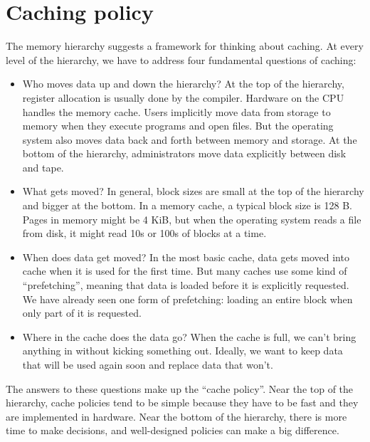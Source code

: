 \documentclass[12pt]{book}
\begin{document}
{\section{Caching policy}

The memory hierarchy suggests a framework for thinking about
caching.  At every level of the hierarchy, we have to address
four fundamental questions of caching:

\begin{itemize}

\item Who moves data up and down the hierarchy?  At the top of the
  hierarchy, register allocation is usually done by the compiler.
  Hardware on the CPU handles the memory cache.  Users implicitly move
  data from storage to memory when they execute programs and open
  files.  But the operating system also moves data back and forth
  between memory and storage.  At the bottom of the hierarchy,
  administrators move data explicitly between disk and tape.

\item What gets moved?  In general, block sizes are small at the top
  of the hierarchy and bigger at the bottom.  In a memory cache, a
  typical block size is 128 B.  Pages in memory might be 4 KiB, but
  when the operating system reads a file from disk, it might read 10s
  or 100s of blocks at a time.

\item When does data get moved?  In the most basic cache, data gets
  moved into cache when it is used for the first time.  But many
  caches use some kind of ``prefetching'', meaning that data is
  loaded before it is explicitly requested.  We have already seen
  one form of prefetching: loading an entire block when only part of
  it is requested.

\item Where in the cache does the data go?  When the cache is full, we
  can't bring anything in without kicking something out.  Ideally,
  we want to keep data that will be used again soon and replace data
  that won't.

\end{itemize}

The answers to these questions make up the ``cache policy''.
Near the top of the hierarchy, cache policies tend to be simple
because they have to be fast and they are implemented in hardware.
Near the bottom of the hierarchy, there is more time to make decisions,
and well-designed policies can make a big difference.

}
\end{document}
